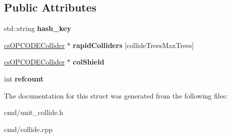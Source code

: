 \subsection*{Public Attributes}
\begin{DoxyCompactItemize}
\item 
std\+::string {\bfseries hash\+\_\+key}\hypertarget{structcollideTrees_aba88bdabb86722bbd7d8ce9121443e42}{}\label{structcollideTrees_aba88bdabb86722bbd7d8ce9121443e42}

\item 
\hyperlink{classcsOPCODECollider}{cs\+O\+P\+C\+O\+D\+E\+Collider} $\ast$ {\bfseries rapid\+Colliders} \mbox{[}collide\+Trees\+Max\+Trees\mbox{]}\hypertarget{structcollideTrees_a6475badc4575e0adcd2341fb9f37c724}{}\label{structcollideTrees_a6475badc4575e0adcd2341fb9f37c724}

\item 
\hyperlink{classcsOPCODECollider}{cs\+O\+P\+C\+O\+D\+E\+Collider} $\ast$ {\bfseries col\+Shield}\hypertarget{structcollideTrees_aeaa375618c0b1028d40e0273f234d7a8}{}\label{structcollideTrees_aeaa375618c0b1028d40e0273f234d7a8}

\item 
int {\bfseries refcount}\hypertarget{structcollideTrees_acb3f8a081496800077213b6c641aa047}{}\label{structcollideTrees_acb3f8a081496800077213b6c641aa047}

\end{DoxyCompactItemize}


The documentation for this struct was generated from the following files\+:\begin{DoxyCompactItemize}
\item 
cmd/unit\+\_\+collide.\+h\item 
cmd/collide.\+cpp\end{DoxyCompactItemize}
